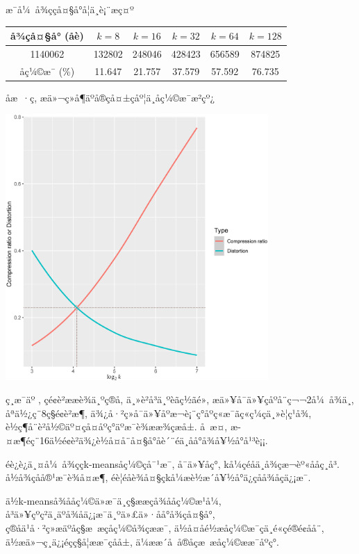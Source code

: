 \documentclass[lang=cn,11pt]{elegantpaper}
\begin{document}
æ¯å¼ å¾ççå¤§å°å¦ä¸è¡¨æç¤º
\begin{table}[ht]
    \centering
    \begin{tabular}{c|ccccc}
    \hline
    å¾çå¤§å° (å­è)  & $k=8$    & $k=16$   & $k=32$   & $k=64$   & $k=128$  \\ \hline
    1140062  & 132802 & 248046 & 428423 & 656589 & 874825 \\
    åç¼©æ¯ (\%) & 11.647 & 21.757 & 37.579 & 57.592 & 76.735 \\ \hline
    \end{tabular}
\end{table}

åæ ·ç, æä»¬ç»å¶äºå®çå¤±çåº¦ä¸åç¼©æ¯æ²çº¿
\begin{center}
    \hspace{53pt}\includegraphics[width=0.75\textwidth]{cat2to}
\end{center}

ç¸æ¯äº ,  çé¢è²ææè¾ä¸ºç®å, ä¸»è²å³ä¸ºèãç½ãé», æä»¥å¯ä»¥çåºå¨ç¬¬2å¼ å¾ä¸­, åªä½¿ç¨8ç§é¢è²æ¶, ä¾¿å·²ç»å¯ä»¥åºæ¬è¡¨ç°åºç«æ¯ãç«ç¼ç­ä¸»è¦ç¹å¾, è½ç¶å¨è²å½©äº¤çå¤åºç°äºæ¯è¾ææ¾çæ­å±. å æ­¤, æ­¤æ¶éç¨16ä½é¢è²ä¾¿è½å¤å¨å¤§å°åè´¨éä¸åå°å¾å¥½å°å¹³è¡¡.

éè¿è¿ä¸¤å¼ å¾ççk-meansåç¼©çå¯¹æ¯, å¯ä»¥åç°, kå¼çéåä¸å¾çæ¬èº«ååç¸å³. å½å¾çåå®¹æ¯è¾å¤æ¶, éè¦éåè¾å¤§çkå¼æè½æ´å¥½å°ä¿çåå¾åçä¿¡æ¯. 

ä½k-meanså¾ååç¼©ä»æ¯ä¸ç§ææçå¾ååç¼©æ¹å¼, å³ä»¥çºç²ä¸äºå¾åä¿¡æ¯ä¸ºä»£ä»·åå°å¾çå¤§å°, ç®åä¹å·²ç»æäºåç§æ æçåç¼©å¾çææ¯, ä½å¤åé½æåç¼©æ¯çä¸é«çé®é¢å­å¨, ä½æä»¬ç¸ä¿¡éçç§å­¦ææ¯çåå±, ä¼ææ´å å®åçæ æåç¼©ææ¯åºç°. 
\end{document}
